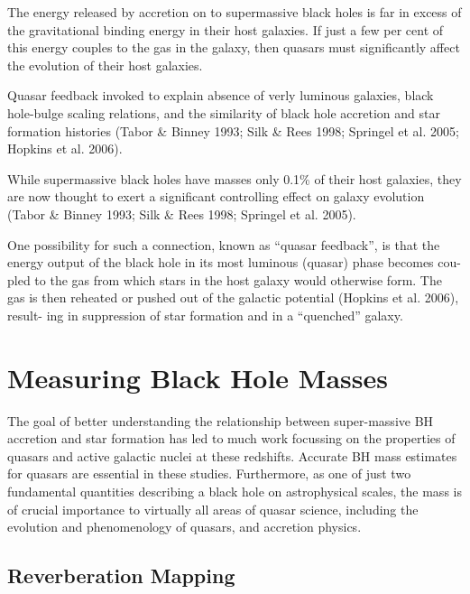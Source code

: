The energy released by accretion on to supermassive black holes is far in excess of the gravitational binding energy in their host galaxies. 
If just a few per cent of this energy couples to the gas in the galaxy, then quasars must significantly affect the evolution of their host galaxies. 

Quasar feedback invoked to explain absence of verly luminous galaxies, black hole-bulge scaling relations, and the similarity of black hole accretion and star formation histories (Tabor \& Binney 1993; Silk \& Rees 1998; Springel et al. 2005; Hopkins et al. 2006).

While supermassive black holes have masses only 0.1\% of their host galaxies, they are now thought to exert a significant controlling effect on galaxy evolution (Tabor \& Binney 1993; Silk \& Rees 1998; Springel et al. 2005).

One possibility for such a connection, known as “quasar feedback”, is that the energy output of the black hole in its most luminous (quasar) phase becomes cou- pled to the gas from which stars in the host galaxy would otherwise form.
The gas is then reheated or pushed out of the galactic potential (Hopkins et al. 2006), result- ing in suppression of star formation and in a “quenched” galaxy.


\section{Measuring Black Hole Masses}

The goal of better understanding the relationship between super-massive BH accretion and star formation has led to much work focussing on the properties of quasars
and active galactic nuclei at these redshifts.
Accurate BH mass estimates for quasars are essential in these studies. 
Furthermore, as one of just two fundamental quantities describing a black hole on astrophysical
scales, the mass is of crucial importance to virtually all areas of quasar science, including the evolution and phenomenology of quasars, and accretion physics.

\subsection{Reverberation Mapping}

